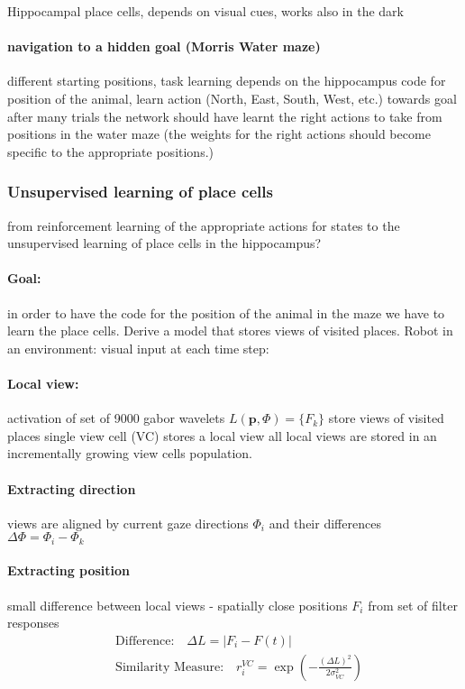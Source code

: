 \documentclass[11pt]{article}
\newcommand\abs[1]{\left|#1\right|}
\begin{document}
Hippocampal place cells, depends on visual cues, works also in the dark
\paragraph{navigation to a hidden goal (Morris Water maze)}
different starting positions, task learning depends on the hippocampus
code for position of the animal, learn action (North, East, South, West, etc.) towards goal
after many trials the network should have learnt the right actions to take from positions in the water maze (the weights for the right actions should become specific to the appropriate positions.)

\subsubsection{Unsupervised learning of place cells}
from reinforcement learning of the appropriate actions for states to the unsupervised learning of place cells in the hippocampus?
\paragraph{Goal:} in order to have the code for the position of the animal in the maze we have to learn the place cells. Derive a model that stores views of visited places. 
Robot in an environment: visual input at each time step:
\paragraph{Local view:} activation of set of 9000 gabor wavelets $L(\mathbf{p},\Phi)=\{F_k\}$
store views of visited places
single view cell (VC) stores a local view
all local views are stored in an incrementally growing view cells population.

\paragraph{Extracting direction} views are aligned by current gaze directions $\Phi_i$ and their differences $\Delta\Phi=\Phi_i-\Phi_k$

\paragraph{Extracting position} small difference between local views - spatially close positions
$F_i$ from set of filter responses
\begin{align*}
&\text{Difference:} \quad \Delta L = \abs{F_i-F(t)}\\
&\text{Similarity Measure:} \quad r_i^{VC}=\exp\left(-\frac{(\Delta L)^2}{2\sigma^2_{VC}}\right)
\end{align*}
\end{document}
